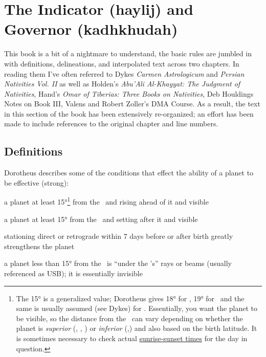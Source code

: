 \section{The Indicator (haylij) and Governor (kadhkhudah)}
\begin{mdframed}[backgroundcolor=cyan!5, rightmargin=1em, leftmargin=1em]
This  book is a bit of a nightmare to understand, the basic rules are jumbled in with definitions, delineations, and interpolated text across two chapters. In reading them I've often referred to Dykes \textsl{Carmen Astrologicum} and \textsl{Persian Nativities Vol. II} as well as Holden's \textsl{Abu'Ali Al-Khayyat: The Judgment of Nativities}, Hand's \textsl{Omar of Tiberias: Three Books on Nativities}, Deb Houldings Notes on Book III, Valens and Robert Zoller's DMA Course. As a result, the text in this section of the book has been extensively re-organized; an effort has been made to include references to the original chapter and line numbers.
\end{mdframed}

\subsection{Definitions}
Dorotheus describes some of the conditions that effect the ability of a planet to be effective (strong):
\begin{description}[style=multiline,leftmargin=7em]
\item[Eastern]a planet at least 15°\footnote{The 15° is a generalized value; Dorotheus gives 18° for \Mars, 19° for \Mercury\, and the same is usually assumed (see Dykes) for \Venus. Essentially, you want the planet to be visible, so the distance from the \Sun\, can vary depending on whether the planet is \textsl{superior} (\Saturn, \Jupiter, \Mars) or \textsl{inferior} (\Venus,\Mercury) and also based on the birth latitude. It is sometimes necessary to check actual \href{https://www.sunrise-and-sunset.com/en/sun}{sunrise-sunset times} for the day in question.} from the \Sun\, and rising ahead of it and visible
\item[Western ]a planet at least 15° from the \Sun\, and setting after it and visible
\item[Station] stationing direct or retrograde within 7 days before or after birth greatly strengthens the planet
\item[USB] a planet less than 15° from the \Sun\, is ``under the \Sun's'' rays or beams (usually referenced as USB); it is essentially invisible
\end{description}

